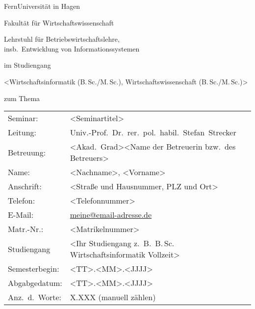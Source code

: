 \documentclass[%
draft=false,%
paper=a4,%
fontsize=12pt,%
pagesize=auto,%
twoside=false,%
headings=small,openany,%
chapterprefix=false,%
version=last,%
titlepage=true,%
parskip=half+,%
mpinclude=false,%
headsepline=true,%
numbers=noendperiod%
]{scrbook}
\makeatletter
\newcommand{\MSc}{M.\,Sc.\@\xspace}
\newcommand{\BSc}{B.\,Sc.\@\xspace}
\makeatother
\begin{document}
\frontmatter

\begin{titlepage}
\thispagestyle{empty}

\begin{center}
	\noindent\Huge FernUniversität in Hagen
	
	\bigskip
	
	\noindent\huge Fakultät für Wirtschaftswissenschaft
	
	\bigskip
	
	\noindent\normalsize Lehrstuhl für Betriebswirtschaftslehre,\\
	\noindent\normalsize insb.\ Entwicklung von Informationssystemen
	
	\vspace{3cm}
	
	\noindent\normalsize <Seminar-, Bachelor-, Masterarbeit>
	
	\smallskip
	
	\noindent\normalsize im Studiengang
	
	\smallskip
	
	\noindent\normalsize <Wirtschaftsinformatik (\BSc/\MSc), Wirtschaftswissenschaft (\BSc/\MSc)>
	
	\smallskip
	
	\noindent\normalsize zum Thema
	
	\bigskip
		
	\begin{shaded}
	\end{shaded}	
	
	\vspace{2cm}
\end{center}

	\begin{tabular}{ll}
		Seminar:	&	<Seminartitel> \\
		Leitung:	&	Univ.-Prof.\ Dr.\ rer.\ pol.\ habil.\ Stefan~Strecker \\
		Betreuung:  &	<Akad.\ Grad><Name der Betreuerin bzw.\ des Betreuers>\\
		Name:		&	<Nachname>, <Vorname>\\
		Anschrift:	&	<Straße und Hausnummer, PLZ und Ort>\\
		Telefon:	&	<Telefonnummer>\\
		E-Mail:		&	\href{mailto:meine@email-adresse.de}{meine@email-adresse.de}\\
		Matr.-Nr.:	& 	<Matrikelnummer>\\
		Studiengang	&	<Ihr Studiengang z.\ B.\ \BSc Wirtschaftsinformatik Vollzeit>\\
		Semesterbegin:	&	<TT>.<MM>.<JJJJ> \\
		Abgabgedatum:	&	<TT>.<MM>.<JJJJ> \\
		Anz.\ d.\ Worte:	&	X.XXX (manuell zählen)\\	
	\end{tabular}
	


\end{titlepage}
\end{document}
